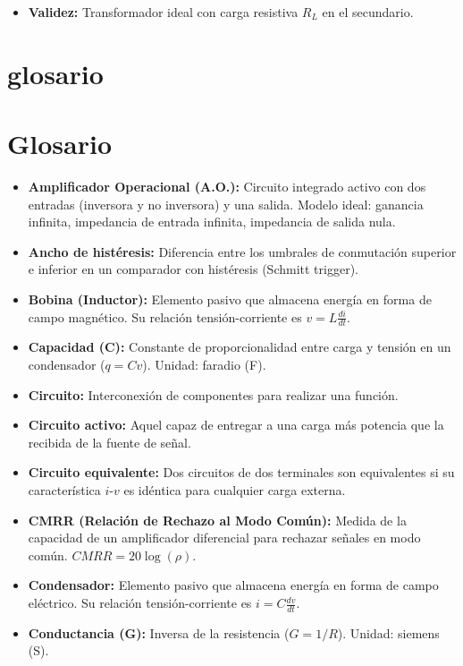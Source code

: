 \documentclass[11pt,a4paper]{article}
\begin{document}
\begin{itemize}[leftmargin=*,topsep=2pt,itemsep=1pt]
  \item \textbf{Validez:} Transformador ideal con carga resistiva $R_L$ en el secundario.
\end{itemize}


\section*{glosario}

\section*{Glosario}


\begin{itemize}[leftmargin=*,topsep=2pt,itemsep=1pt]
  \item \textbf{Amplificador Operacional (A.O.):} Circuito integrado activo con dos entradas (inversora y no inversora) y una salida. Modelo ideal: ganancia infinita, impedancia de entrada infinita, impedancia de salida nula.
  \item \textbf{Ancho de histéresis:} Diferencia entre los umbrales de conmutación superior e inferior en un comparador con histéresis (Schmitt trigger).
  \item \textbf{Bobina (Inductor):} Elemento pasivo que almacena energía en forma de campo magnético. Su relación tensión-corriente es $v = L \frac{di}{dt}$.
  \item \textbf{Capacidad (C):} Constante de proporcionalidad entre carga y tensión en un condensador ($q = C v$). Unidad: faradio (F).
  \item \textbf{Circuito:} Interconexión de componentes para realizar una función.
  \item \textbf{Circuito activo:} Aquel capaz de entregar a una carga más potencia que la recibida de la fuente de señal.
  \item \textbf{Circuito equivalente:} Dos circuitos de dos terminales son equivalentes si su característica $i$-$v$ es idéntica para cualquier carga externa.
  \item \textbf{CMRR (Relación de Rechazo al Modo Común):} Medida de la capacidad de un amplificador diferencial para rechazar señales en modo común. $CMRR = 20 \log(\rho)$.
  \item \textbf{Condensador:} Elemento pasivo que almacena energía en forma de campo eléctrico. Su relación tensión-corriente es $i = C \frac{dv}{dt}$.
  \item \textbf{Conductancia (G):} Inversa de la resistencia ($G = 1/R$). Unidad: siemens (S).

\end{itemize}
\end{document}
